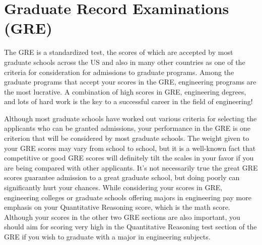 \section*{Graduate Record Examinations (GRE)}

The GRE is a standardized test, the scores of which are accepted by most graduate schools across the US and also in many other countries as one of the criteria for consideration for admissions to graduate programs. Among the graduate programs that accept your scores in the GRE, engineering programs are the most lucrative. A combination of high scores in GRE, engineering degrees, and lots of hard work is the key to a successful career in the field of engineering!

Although most graduate schools have worked out various criteria for selecting the applicants who can be granted admissions, your performance in the GRE is one criterion that will be considered by most graduate schools. The weight given to your GRE scores may vary from school to school, but it is a well-known fact that competitive or good GRE scores will definitely tilt the scales in your favor if you are being compared with other applicants. It's not necessarily true the great GRE scores guarantee admission to a great graduate school, but doing poorly can significantly hurt your chances. While considering your scores in GRE, engineering colleges or graduate schools offering majors in engineering pay more emphasis on your Quantitative Reasoning score, which is the math score. Although your scores in the other two GRE sections are also important, you should aim for scoring very high in the Quantitative Reasoning test section of the GRE if you wish to graduate with a major in engineering subjects.


